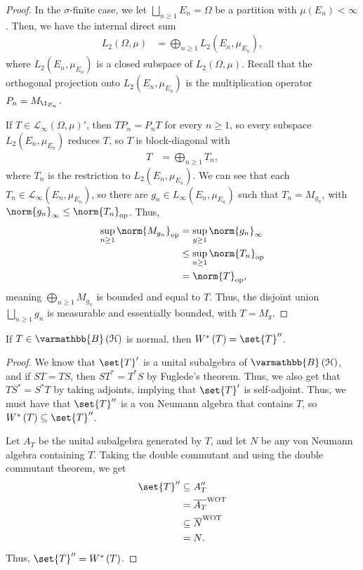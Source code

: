 \documentclass[10pt]{mypackage}
\renewcommand*{\mathbb}[1]{\varmathbb{#1}}
\newcommand{\B}{\mathbb{B}}
\begin{document}
\begin{proof}
  In the $\sigma$-finite case, we let $\bigsqcup_{n\geq 1}E_n = \Omega$ be a partition with $\mu\left(E_n\right) < \infty$. Then, we have the internal direct sum
  \begin{align*}
    L_2\left(\Omega,\mu\right) &= \bigoplus_{n\geq 1}L_2\left(E_n,\mu_{E_n}\right),
  \end{align*}
  where $L_2\left(E_n,\mu_{E_n}\right)$ is a closed subspace of $L_2\left(\Omega,\mu\right)$. Recall that the orthogonal projection onto $L_2\left(E_n,\mu_{E_n}\right)$ is the multiplication operator $P_n = M_{\1_{E_n}}$.\newline

  If $T\in \mathcal{L}_{\infty}\left(\Omega,\mu\right)'$, then $TP_n = P_nT$ for every $n\geq 1$, so every subspace $L_2\left(E_n,\mu_{E_n}\right)$ reduces $T$, so $T$ is block-diagonal with
  \begin{align*}
    T &= \bigoplus_{n\geq 1}T_n,
  \end{align*}
  where $T_n$ is the restriction to $L_2\left(E_n,\mu_{E_n}\right)$. We can see that each $T_n\in \mathcal{L}_{\infty}\left(E_n,\mu_{E_n}\right)$, so there are $g_n\in L_{\infty}\left(E_n,\mu_{E_n}\right)$ such that $T_n = M_{g_n}$, with $\norm{g_n}_{\infty}\leq \norm{T_n}_{\text{op}}$. Thus,
  \begin{align*}
    \sup_{n\geq 1}\norm{M_{g_n}}_{\text{op}} &= \sup_{g\geq 1}\norm{g_n}_{\infty}\\
                                             &\leq \sup_{n\geq 1}\norm{T_n}_{\text{op}}\\
                                             &= \norm{T}_{\text{op}},
  \end{align*}
  meaning $\bigoplus_{n\geq 1}M_{g_n}$ is bounded and equal to $T$. Thus, the disjoint union $\bigsqcup_{n\geq 1}g_n$ is measurable and essentially bounded, with $T = M_{g}$.
\end{proof}
\begin{corollary}
  If $T\in \B\left(\mathcal{H}\right)$ is normal, then $W^{\ast}\left(T\right)= \set{T}''$.
\end{corollary}
\begin{proof}
  We know that $\set{T}'$ is a unital subalgebra of $\B\left(\mathcal{H}\right)$, and if $ST = TS$, then $ST^{\ast} = T^{\ast}S$ by Fuglede's theorem. Thus, we also get that $TS^{\ast} = S^{\ast}T$ by taking adjoints, implying that $\set{T}'$ is self-adjoint. Thus, we must have that $\set{T}''$ is a von Neumann algebra that contains $T$, so $W^{\ast}\left(T\right) \subseteq \set{T}''$.\newline

  Let $A_{T}$ be the unital subalgebra generated by $T$, and let $N$ be any von Neumann algebra containing $T$. Taking the double commutant and using the double commutant theorem, we get
  \begin{align*}
    \set{T}'' &\subseteq A_{T}''\\
              &= \overline{A_T}^{\text{WOT}}\\
              &\subseteq \overline{N}^{\text{WOT}}\\
              &= N.
  \end{align*}
  Thus, $\set{T}'' = W^{\ast}\left(T\right)$.
\end{proof}
\end{document}
